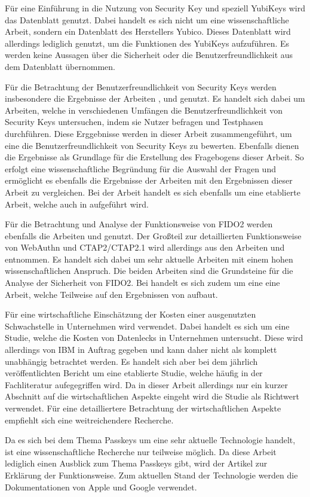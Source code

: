 Für eine Einführung in die Nutzung von Security Key und speziell YubiKeys wird das Datenblatt \cite{yuibkey2023fido2} genutzt. Dabei handelt es sich nicht um eine wissenschaftliche Arbeit, sondern ein Datenblatt des Herstellers Yubico. Dieses Datenblatt wird allerdings lediglich genutzt, um die Funktionen des YubiKeys aufzuführen. Es werden keine Aussagen über die Sicherheit oder die Benutzerfreundlichkeit aus dem Datenblatt übernommen.

Für die Betrachtung der Benutzerfreundlichkeit von Security Keys werden insbesondere die Ergebnisse der Arbeiten \cite{farke2020you}, \cite{lyastani2020fido2} und \cite{reynolds2018tale} genutzt. Es handelt sich dabei um Arbeiten, welche in verschiedenen Umfängen die Benutzerfreundlichkeit von Security Keys untersuchen, indem sie Nutzer befragen und Testphasen durchführen. Diese Erggebnisse werden in dieser Arbeit zusammengeführt, um eine die Benutzerfreundlichkeit von Security Keys zu bewerten. Ebenfalls dienen die Ergebnisse als Grundlage für die Erstellung des Fragebogens dieser Arbeit. So erfolgt eine wissenschaftliche Begründung für die Auswahl der Fragen und ermöglicht es ebenfalls die Ergebnisse der Arbeiten mit den Ergebnissen dieser Arbeit zu vergleichen. Bei der Arbeit \cite{reynolds2018tale} handelt es sich ebenfalls um eine etablierte Arbeit, welche auch in \cite{lyastani2020fido2} aufgeführt wird. 

Für die Betrachtung und Analyse der Funktionsweise von FIDO2 werden ebenfalls die Arbeiten \cite{farke2020you} und \cite{lyastani2020fido2} genutzt. Der Großteil zur detaillierten Funktionsweise von WebAuthn und CTAP2/CTAP2.1 wird allerdings aus den Arbeiten \cite{barbosa2021provable} und \cite{bindel2022fido2} entnommen. Es handelt sich dabei um sehr aktuelle Arbeiten mit einem hohen wissenschaftlichen Anspruch. Die beiden Arbeiten sind die Grundsteine für die Analyse der Sicherheit von FIDO2. Bei \cite{bindel2022fido2} handelt es sich zudem um eine eine Arbeit, welche Teilweise auf den Ergebnissen von \cite{barbosa2021provable} aufbaut.

Für eine wirtschaftliche Einschätzung der Kosten einer ausgenutzten Schwachstelle in Unternehmen wird \cite{databreach} verwendet. Dabei handelt es sich um eine Studie, welche die Kosten von Datenlecks in Unternehmen untersucht. Diese wird allerdings von IBM in Auftrag gegeben und kann daher nicht als komplett unabhängig betrachtet werden. Es handelt sich aber bei dem jährlich veröffentlichten Bericht um eine etablierte Studie, welche häufig in der Fachliteratur aufegegriffen wird. Da in dieser Arbeit allerdings nur ein kurzer Abschnitt auf die wirtschaftlichen Aspekte eingeht wird die Studie als Richtwert verwendet. Für eine detailliertere Betrachtung der wirtschaftlichen Aspekte empfiehlt sich eine weitreichendere Recherche.

Da es sich bei dem Thema Passkeys um eine sehr aktuelle Technologie handelt, ist eine wissenschaftliche Recherche nur teilweise möglich. Da diese Arbeit lediglich einen Ausblick zum Thema Passkeys gibt, wird der Artikel \cite{usecasfido} zur Erklärung der Funktionsweise. Zum aktuellen Stand der Technologie werden die Dokumentationen von Apple \cite{passkeysapple} und Google \cite{passkeysgoogle} \cite{passkeysgoogledev} verwendet.